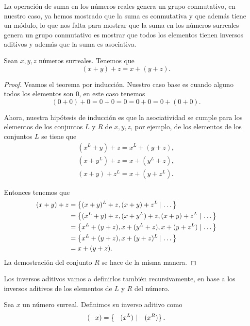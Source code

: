     La operaci\'on de suma en los n\'umeros reales genera un grupo conmutativo, en nuestro caso, ya hemos mostrado que la suma es conmutativa y que adem\'as tiene un m\'odulo, lo que nos falta para mostrar que la suma en los n\'umeros surreales genera un grupo conmutativo es mostrar que todos los elementos tienen inversos aditivos y adem\'as que la suma es asociativa.

    \begin{theorem}
        Sean $x, y, z$ n\'umeros surreales. Tenemos que
        \[
            (x+y)+z = x+(y+z).
        \]
    \end{theorem}

    \begin{proof}
        Veamos el teorema por inducci\'on. Nuestro caso base es cuando alguno todos los elementos son $0$, en este caso tenemos
        \[
            (0+0)+0 = 0+0 = 0 = 0+0 = 0+(0+0).
        \]

        Ahora, nuestra hip\'otesis de inducci\'on es que la asociatividad se cumple para los elementos de los conjuntos $L$ y $R$ de $x,y,z$, por ejemplo, de los elementos de los conjuntos $L$ se tiene que
        \begin{align*}
            (x^L+y)+z = x^L + (y+z), \\
            (x+y^L)+z = x + (y^L+z), \\
            (x+y)+z^L = x + (y+z^L).
        \end{align*}

        Entonces tenemos que
        \begin{align*}
            (x+y)+z & = \left\{(x+y)^L+z, (x+y)+z^L\mid \dots\right\} \\
                    & = \left\{(x^L+y)+z, (x+y^L)+z, (x+y)+z^L\mid \dots\right\} \\
                    & = \left\{x^L+(y+z), x+(y^L+z), x+(y+z^L)\mid \dots\right\} \\
                    & = \left\{x^L+(y+z), x+(y+z)^L\mid \dots\right\} \\
                    & = x+(y+z).
        \end{align*}
        La demostraci\'on del conjunto $R$ se hace de la misma manera.
    \end{proof}

    Los inversos aditivos vamos a definirlos tambi\'en recursivamente, en base a los inversos aditivos de los elementos de $L$ y $R$ del n\'umero.

    \begin{definition}
        Sea $x$ un n\'umero surreal. Definimos su inverso aditivo como
        \[
            (-x) = \left\{-(x^L)\mid -(x^R)\right\}.
        \]
    \end{definition}

